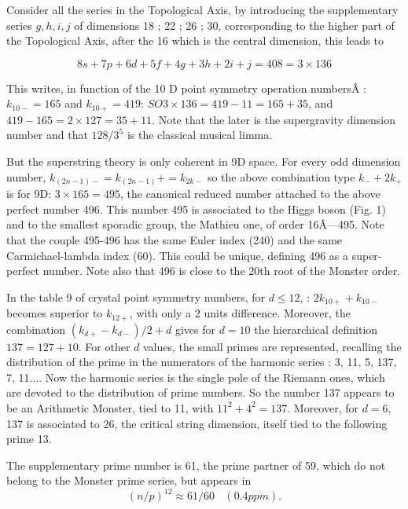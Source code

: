 \documentclass[a4paper,9pt]{article}
\begin{document}
     Consider all the series in the Topological Axis, by introducing the supplementary series $g, h, i, j$ of dimensions 18 ; 22 ; 26 ; 30, corresponding to the higher part of the Topological Axis, after the 16 which is the central dimension, this leads to
     
     \begin{equation}
      8s + 7p + 6 d + 5f + 4g + 3h + 2i + j = 408 = 3 \times 136   
     \end{equation}
      
     
     This writes, in function of the 10 D point symmetry operation numbersÂ :  $k_{10-} = 165$ and $k_{10+} = 419$: $SO3 \times 136 = 419 - 11 = 165 + 35$, and $419-165 = 2 \times 127 =  35 + 11$. Note that the later is the supergravity dimension number and that $128/3^5$ is the classical musical limma. 
     
     
     But the superstring theory is only coherent in 9D space. For every odd dimension number, $k_{(2n - 1)-} = k_(2n - 1)+ = k_{2k-}$ so the above combination type $k_- + 2k_+$ is for 9D: $3 \times 165 = 495$, the canonical reduced number attached to the above perfect number 496. This number 495 is associated to the Higgs boson (Fig. 1) and to the smallest sporadic group, the Mathieu one, of order 16Ã—495. Note that the couple 495-496 has the same Euler index (240) and the same Carmichael-lambda index (60). This could be unique, defining 496 as a super-perfect number. Note also that 496 is close to the 20th root of the Monster order.
     
     
     In the table 9 of crystal point symmetry numbers, for $d \le 12$, : $2k_{10+} +  k_{10-}$ becomes superior to $k_{12+}$, with only a 2 units difference. Moreover, the combination $(k_{d+} -  k_{d-})/2 + d$ gives for $d = 10$ the hierarchical definition $  137 = 127 + 10$. For other $d$ values, the small primes are represented, recalling the distribution of the prime in the numerators of the harmonic series : 3, 11, 5, 137, 7, 11.... Now the harmonic series is the single pole of the Riemann ones, which are devoted to the distribution of prime numbers. So the number 137 appears to be an Arithmetic Monster, tied to 11, with $11^2 +  4^2 = 137$. Moreover, for $d = 6$, 137 is associated to 26, the critical string dimension, itself tied to the following prime 13.
  
    The supplementary prime number is 61, the prime partner of 59, which do not belong to the Monster prime series, but appears in
    \begin{equation}
    (n/p)^{12} \approx 61/60~~~~   (0.4 ppm).    
    \end{equation}
    
\end{document}
